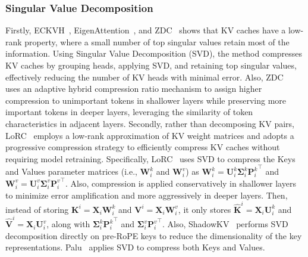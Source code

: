 \subsubsection{Singular Value Decomposition}\label{sssec:kv_low_rank_svd}
Firstly, 
ECKVH~\cite{yu2024effectively}, EigenAttention~\cite{saxena2024eigen}, and ZDC~\cite{zhang2024zero} shows that KV caches have a low-rank property, where a small number of top singular values retain most of the information. Using Singular Value Decomposition (SVD), the method compresses KV caches by grouping heads, applying SVD, and retaining top singular values, effectively reducing the number of KV heads with minimal error.
Also, ZDC~\cite{zhang2024zero} uses an adaptive hybrid compression ratio mechanism to assign higher compression to unimportant tokens in shallower layers while preserving more important tokens in deeper layers, leveraging the similarity of token characteristics in adjacent layers.
Secondly, rather than decomposing KV pairs, LoRC~\cite{zhang2024lorc} employs a low-rank approximation of KV weight matrices and adopts a progressive compression strategy to efficiently compress KV caches without requiring model retraining.
Specifically,
LoRC~\cite{zhang2024lorc} uses SVD to compress the Keys and Values parameter matrices (i.e., $\mathbf{W}^k_i$ and $\mathbf{W}^v_i$) as  $\mathbf{W}^k_i=\mathbf{U}^k_i \mathbf{\Sigma}^k_i {\mathbf{P}^k_i}^\top$ and $\mathbf{W}^v_i=\mathbf{U}^v_i \mathbf{\Sigma}^v_i {\mathbf{P}^v_i}^\top$.
Also, compression is applied conservatively in shallower layers to minimize error amplification and more aggressively in deeper layers.
Then, instead of storing $\mathbf{K}^i=\mathbf{X}_i\mathbf{W}^k_i$ and $\mathbf{V}^i=\mathbf{X}_i\mathbf{W}^v_i$, it only stores $\mathbf{\hat{K}}^i=\mathbf{X}_i\mathbf{U}^k_i$ and $\mathbf{\hat{V}}^i=\mathbf{X}_i\mathbf{U}^v_i$, along with $ \mathbf{\Sigma}^k_i {\mathbf{P}^k_i}^\top$ and $ \mathbf{\Sigma}^v_i {\mathbf{P}^v_i}^\top$.
Also, ShadowKV~\cite{sun2024shadowkv} performs SVD decomposition directly on pre-RoPE keys to reduce the dimensionality of the key representations.
Palu~\cite{chang2024palu} applies SVD to compress both Keys and Values.





